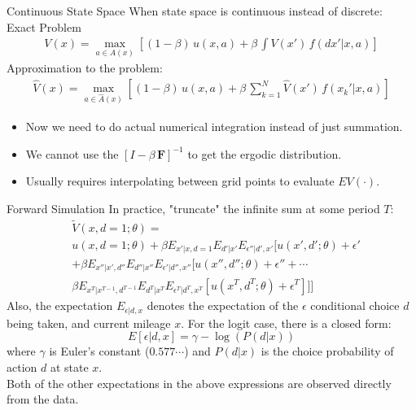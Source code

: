 \begin{frame}{Continuous State Space}
When state space is continuous instead of discrete:\\
Exact Problem
\begin{align*}
V(x) = \max_{a \in A(x)} \left[ (1-\beta)\, u(x,a) + \beta \, \int V(x')\, f(dx' | x,a) \right]
\end{align*}
Approximation to the problem:
\begin{align*}
\hat{V}(x) = \max_{a \in \hat{A}(x)} \left[ (1-\beta) \, u(x,a) + \beta \, \sum_{k=1}^N \hat{V}(x') \, f (x_k' | x,a) \right]
\end{align*}
\begin{itemize}
\item Now we need to do actual numerical integration instead of just summation.
\item We cannot use the $[I- \beta \, \mathbf{F}]^{-1}$ to get the ergodic distribution.
\item Usually requires interpolating between grid points to evaluate $EV(\cdot)$.
\end{itemize}
\end{frame}


\begin{frame}{Forward Simulation}
In practice, "truncate" the infinite sum at some period $T$: 
\begin{align*} 
& \tilde V(x, d=1;\theta) =\\
& u(x, d=1; \theta) + \beta E_{x'|x, d=1} E_{d'|x'} E_{\epsilon''|d', x'} [u(x', d';\theta) + \epsilon' \\
& + \beta E_{x''|x', d''} E_{d''|x''} E_{\epsilon'|d'', x''} [u(x'', d'';\theta) + \epsilon'' + \cdots \\
& \beta E_{x^T|x^{T-1}, d^{T-1}} E_{d^T|x^T} E_{\epsilon^T|d^T, x^T} [u(x^T, d^T;\theta) + \epsilon^T ]]]
\end{align*}
Also, the expectation $E_{\epsilon|d, x}$ denotes the expectation of the $\epsilon$ conditional choice $d$ being taken, and current mileage $x$. For the logit case, there is a closed form:
$$ E[\epsilon | d, x] = \gamma - \log(P(d|x))$$
where $\gamma$ is Euler's constant ($0.577\cdots$) and $P(d|x)$ is the choice probability of action $d$ at state $x$. \\
\vspace{2mm}
Both of the other expectations in the above expressions are observed directly from the data. 
\end{frame}

